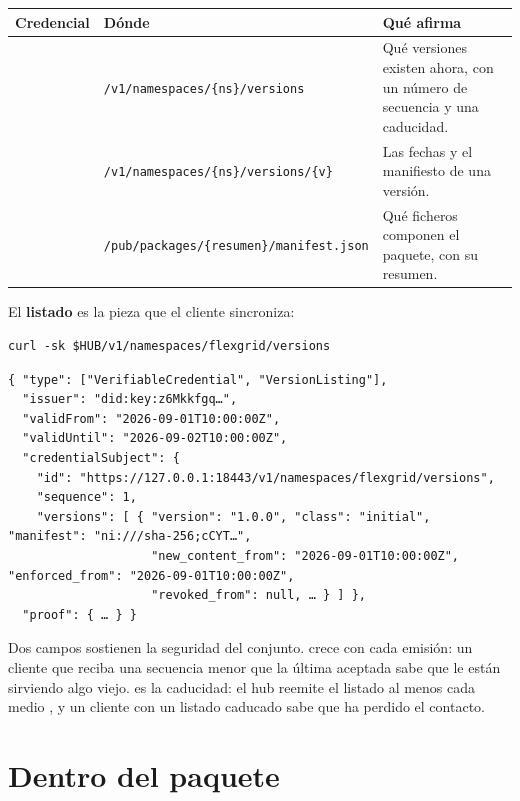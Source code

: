 \noindent\begin{tabularx}{\linewidth}{@{}L{3.1cm}L{5.4cm}Y@{}}
\toprule
\textbf{Credencial} & \textbf{Dónde} & \textbf{Qué afirma} \\
\midrule
{} & \texttt{/\allowbreak{}v1/\allowbreak{}namespaces/\allowbreak{}\{ns\}/\allowbreak{}versions} & Qué versiones existen ahora, con un número de secuencia y una caducidad. \\
 & \texttt{/\allowbreak{}v1/\allowbreak{}namespaces/\allowbreak{}\{ns\}/\allowbreak{}versions/\allowbreak{}\{v\}} & Las fechas y el manifiesto de una versión. \\
 & \texttt{/\allowbreak{}pub/\allowbreak{}packages/\allowbreak{}\{resumen\}/\allowbreak{}manifest.json} & Qué ficheros componen el paquete, con su resumen. \\
\bottomrule
\end{tabularx}

\medskip
El \textbf{listado} es la pieza que el cliente sincroniza:

\begin{lstlisting}[style=sh]
curl -sk $HUB/v1/namespaces/flexgrid/versions
\end{lstlisting}
\begin{lstlisting}[style=out]
{ "type": ["VerifiableCredential", "VersionListing"],
  "issuer": "did:key:z6Mkkfgq…",
  "validFrom": "2026-09-01T10:00:00Z",
  "validUntil": "2026-09-02T10:00:00Z",
  "credentialSubject": {
    "id": "https://127.0.0.1:18443/v1/namespaces/flexgrid/versions",
    "sequence": 1,
    "versions": [ { "version": "1.0.0", "class": "initial", "manifest": "ni:///sha-256;cCYT…",
                    "new_content_from": "2026-09-01T10:00:00Z", "enforced_from": "2026-09-01T10:00:00Z",
                    "revoked_from": null, … } ] },
  "proof": { … } }
\end{lstlisting}

Dos campos sostienen la seguridad del conjunto.  crece con cada emisión: un cliente que reciba una
secuencia menor que la última aceptada sabe que le están sirviendo algo viejo.  es la caducidad:
el hub reemite el listado al menos cada medio , y un cliente con un listado caducado sabe que ha perdido
el contacto.

\section{Dentro del paquete}

